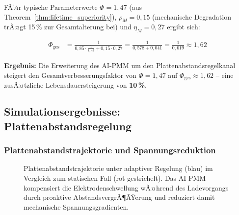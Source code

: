 ﻿\documentclass[12pt,a4paper]{article}
\begin{document}
FÃ¼r typische Parameterwerte $\Phi = 1{,}47$ (aus Theorem~\ref{thm:lifetime_superiority}),
$\rho_M = 0{,}15$ (mechanische Degradation trÃ¤gt 15\,\% zur Gesamtalterung bei)
und $\eta_M = 0{,}27$ ergibt sich:

\begin{align}
	\Phi_\mathrm{ges} &= \frac{1}{0{,}85 \cdot \frac{1}{1{,}47} + 0{,}15 \cdot 0{,}27}
	= \frac{1}{0{,}578 + 0{,}041} = \frac{1}{0{,}619} \approx 1{,}62
	\label{eq:phi_total_numerical}
\end{align}

\textbf{Ergebnis:} Die Erweiterung des AI-PMM um den Plattenabstandsregelkanal
steigert den Gesamtverbesserungsfaktor von $\Phi = 1{,}47$ auf
$\Phi_\mathrm{ges} \approx 1{,}62$ -- eine zusÃ¤tzliche Lebensdauersteigerung
von \textbf{10\,\%}.

\subsection{Simulationsergebnisse: Plattenabstandsregelung}

\subsubsection{Plattenabstandstrajektorie und Spannungsreduktion}

\begin{figure}[H]
	\centering
	\caption{Plattenabstandstrajektorie unter adaptiver Regelung (blau) im
		Vergleich zum statischen Fall (rot gestrichelt). Das AI-PMM kompensiert
		die Elektrodenschwellung wÃ¤hrend des Ladevorgangs durch proaktive
		AbstandsvergrÃ¶ÃŸerung und reduziert damit mechanische Spannungsgradienten.}
	\label{fig:plate_trajectory}
\end{figure}
\end{document}
